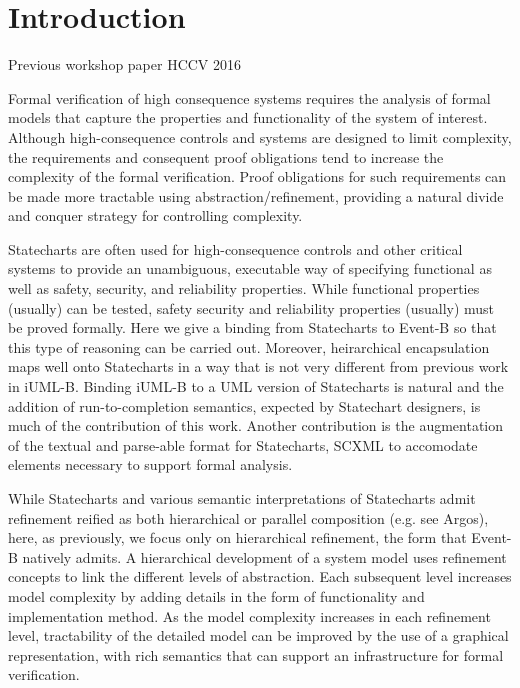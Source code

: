 
\section{Introduction}
\label{sec:introduction}

Previous workshop paper HCCV 2016~\cite{Morris_2016}

Formal verification of high consequence systems requires the analysis
of formal models that capture the properties and functionality of the
system of interest. Although high-consequence controls and systems are
designed to limit complexity, the requirements and consequent proof
obligations tend to increase the complexity of the formal verification.  
Proof obligations for such requirements can be made more tractable using
abstraction/refinement, providing a natural divide and conquer
strategy for controlling complexity.

Statecharts\cite{Harel} are often used for high-consequence controls
and other critical systems to provide an unambiguous, executable way
of specifying functional as well as safety, security, and reliability
properties.  While functional properties (usually) can be tested,
safety security and reliability properties (usually) must be proved
formally.  Here we give a binding from Statecharts to Event-B so that
this type of reasoning can be carried out.  Moreover, heirarchical
encapsulation maps well onto Statecharts in a way that is not very
different from previous work in iUML-B\cite{Snook2006,snook14:_b_statem,Snook12:FMCO}.
Binding iUML-B to a UML version of Statecharts is natural and the
addition of run-to-completion semantics, expected by Statechart
designers, is much of the contribution of this work.  Another
contribution is the augmentation of the textual and parse-able format
for Statecharts, SCXML to accomodate elements necessary to support formal
analysis. 

While Statecharts and various semantic interpretations of Statecharts
admit refinement reified as both hierarchical or parallel composition
(e.g. see Argos\cite{Maraninchi91theargos}), here, as
previously\cite{snook14:_b_statem}, we focus only on hierarchical
refinement, the form that Event-B natively admits.
  A hierarchical development of a system model uses refinement
concepts to link the different levels of abstraction. Each subsequent
level increases model complexity by adding details in the form of
functionality and implementation method. As the model complexity
increases in each refinement level, tractability of the detailed model
can be improved by the use of a graphical representation, with rich
semantics that can support an infrastructure for formal verification.

